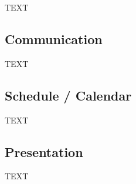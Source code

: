 \documentclass{article}
\begin{document}
TEXT

\subsection{Communication}

TEXT

\subsection{Schedule / Calendar}

TEXT

\subsection{Presentation}

TEXT

{} 
\end{document}
